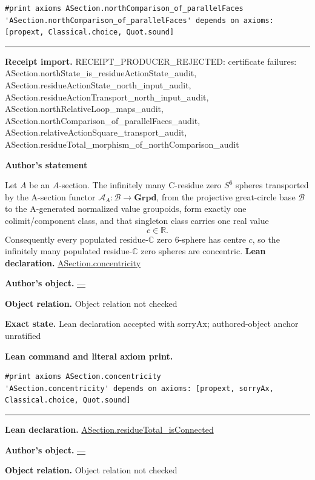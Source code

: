 \documentclass[11pt]{article}
\newcommand{\CC}{\mathbb{C}}
\newcommand{\RR}{\mathbb{R}}
\theoremstyle{plain}
\theoremstyle{definition}
\theoremstyle{remark}
\begin{document}
\begin{tcolorbox}[provenancecard,title={46. Lemma - Transitivity of the C-residue total},title after break={46. Lemma - Transitivity of the C-residue total (continued)}]
\begin{Verbatim}[breaklines=true,breakanywhere=true,fontsize=\small]
#print axioms ASection.northComparison_of_parallelFaces
'ASection.northComparison_of_parallelFaces' depends on axioms: [propext, Classical.choice, Quot.sound]
\end{Verbatim}
\medskip\hrule\medskip
\textbf{Receipt import.} \textcolor{KgtRed}{RECEIPT\_PRODUCER\_REJECTED: certificate failures: ASection.northState\_is\_residueActionState\_audit, ASection.residueActionState\_north\_input\_audit, ASection.residueActionTransport\_north\_input\_audit, ASection.northRelativeLoop\_maps\_audit, ASection.northComparison\_of\_parallelFaces\_audit, ASection.relativeActionSquare\_transport\_audit, ASection.residueTotal\_morphism\_of\_northComparison\_audit}
\end{tcolorbox}
\medskip
\begin{tcolorbox}[provenancecard,title={47. Theorem - Concentricity},title after break={47. Theorem - Concentricity (continued)}]
\textbf{Author's statement}\par
Let $A$ be an $A$-section. The infinitely many C-residue zero $S^6$ spheres transported by the A-section functor
$\mathcal A_A:\mathcal B\to\mathbf{Grpd}$, from the projective great-circle base
$\mathcal B$ to the A-generated normalized value groupoids, form exactly one
colimit/component class, and that
singleton class
carries one real value
\[
  c\in\RR.
\]
Consequently every populated residue-$\CC$ zero $6$-sphere has centre $c$, so the infinitely
many populated residue-$\CC$ zero spheres are concentric.
\tcblower
\textbf{Lean declaration.} \url{ASection.concentricity}
\par\textbf{Author's object.} \url{—}
\par\textbf{Object relation.} Object relation not checked
\par\textbf{Exact state.} Lean declaration accepted with sorryAx; authored-object anchor unratified
\par\smallskip\textbf{Lean command and literal axiom print.}
\begin{Verbatim}[breaklines=true,breakanywhere=true,fontsize=\small]
#print axioms ASection.concentricity
'ASection.concentricity' depends on axioms: [propext, sorryAx, Classical.choice, Quot.sound]
\end{Verbatim}
\medskip\hrule\medskip
\textbf{Lean declaration.} \url{ASection.residueTotal_isConnected}
\par\textbf{Author's object.} \url{—}
\par\textbf{Object relation.} Object relation not checked

\end{tcolorbox}
\end{document}
